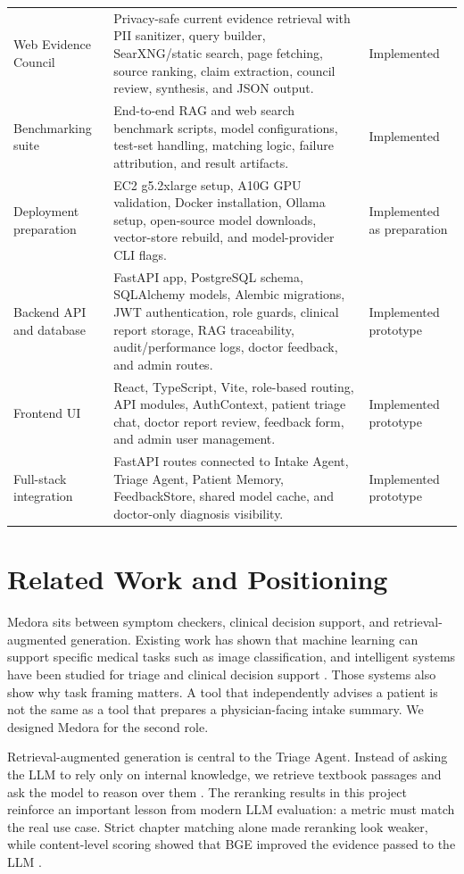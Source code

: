 \begin{longtable}{p{} p{} p{}}
Web Evidence Council & Privacy-safe current evidence retrieval with PII sanitizer, query builder, SearXNG/static search, page fetching, source ranking, claim extraction, council review, synthesis, and JSON output. & Implemented\\
Benchmarking suite & End-to-end RAG and web search benchmark scripts, model configurations, test-set handling, matching logic, failure attribution, and result artifacts. & Implemented\\
Deployment preparation & EC2 g5.2xlarge setup, A10G GPU validation, Docker installation, Ollama setup, open-source model downloads, vector-store rebuild, and model-provider CLI flags. & Implemented as preparation\\
Backend API and database & FastAPI app, PostgreSQL schema, SQLAlchemy models, Alembic migrations, JWT authentication, role guards, clinical report storage, RAG traceability, audit/performance logs, doctor feedback, and admin routes. & Implemented prototype\\
Frontend UI & React, TypeScript, Vite, role-based routing, API modules, AuthContext, patient triage chat, doctor report review, feedback form, and admin user management. & Implemented prototype\\
Full-stack integration & FastAPI routes connected to Intake Agent, Triage Agent, Patient Memory, FeedbackStore, shared model cache, and doctor-only diagnosis visibility. & Implemented prototype\\
\bottomrule
\end{longtable}

\section{Related Work and Positioning}

Medora sits between symptom checkers, clinical decision support, and retrieval-augmented generation. Existing work has shown that machine learning can support specific medical tasks such as image classification, and intelligent systems have been studied for triage and clinical decision support \cite{esteva2017dermatology,fernandes2020triage}. Those systems also show why task framing matters. A tool that independently advises a patient is not the same as a tool that prepares a physician-facing intake summary. We designed Medora for the second role.

Retrieval-augmented generation is central to the Triage Agent. Instead of asking the LLM to rely only on internal knowledge, we retrieve textbook passages and ask the model to reason over them \cite{lewis2020rag}. The reranking results in this project reinforce an important lesson from modern LLM evaluation: a metric must match the real use case. Strict chapter matching alone made reranking look weaker, while content-level scoring showed that BGE improved the evidence passed to the LLM \cite{zheng2023judge}.

